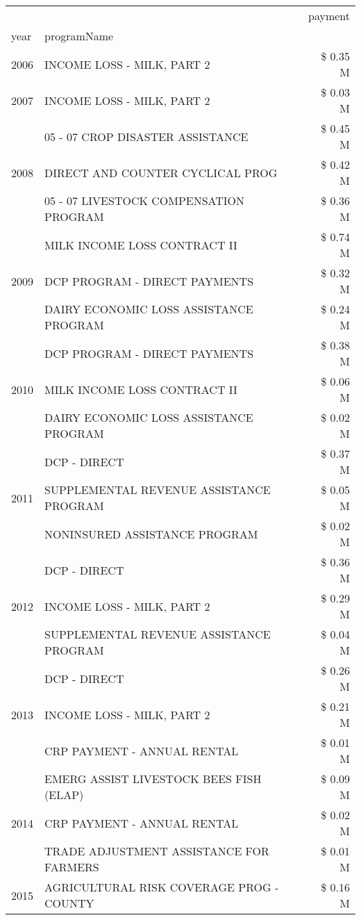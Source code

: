 \begin{tabular}{llr}
\toprule
 &  & payment \\
year & programName &  \\
\midrule
2006 & INCOME LOSS - MILK, PART 2 & \$ 0.35 M \\
\cline{1-3}
2007 & INCOME LOSS - MILK, PART 2 & \$ 0.03 M \\
\cline{1-3}
\multirow[t]{3}{*}{2008} & 05 - 07 CROP DISASTER ASSISTANCE & \$ 0.45 M \\
 & DIRECT AND COUNTER CYCLICAL PROG & \$ 0.42 M \\
 & 05 - 07 LIVESTOCK COMPENSATION PROGRAM & \$ 0.36 M \\
\cline{1-3}
\multirow[t]{3}{*}{2009} & MILK INCOME LOSS CONTRACT II & \$ 0.74 M \\
 & DCP PROGRAM - DIRECT PAYMENTS & \$ 0.32 M \\
 & DAIRY ECONOMIC LOSS ASSISTANCE PROGRAM & \$ 0.24 M \\
\cline{1-3}
\multirow[t]{3}{*}{2010} & DCP PROGRAM - DIRECT PAYMENTS & \$ 0.38 M \\
 & MILK INCOME LOSS CONTRACT II & \$ 0.06 M \\
 & DAIRY ECONOMIC LOSS ASSISTANCE PROGRAM & \$ 0.02 M \\
\cline{1-3}
\multirow[t]{3}{*}{2011} & DCP - DIRECT & \$ 0.37 M \\
 & SUPPLEMENTAL REVENUE ASSISTANCE PROGRAM & \$ 0.05 M \\
 & NONINSURED ASSISTANCE PROGRAM & \$ 0.02 M \\
\cline{1-3}
\multirow[t]{3}{*}{2012} & DCP - DIRECT & \$ 0.36 M \\
 & INCOME LOSS - MILK, PART 2 & \$ 0.29 M \\
 & SUPPLEMENTAL REVENUE ASSISTANCE PROGRAM & \$ 0.04 M \\
\cline{1-3}
\multirow[t]{3}{*}{2013} & DCP - DIRECT & \$ 0.26 M \\
 & INCOME LOSS - MILK, PART 2 & \$ 0.21 M \\
 & CRP PAYMENT - ANNUAL RENTAL & \$ 0.01 M \\
\cline{1-3}
\multirow[t]{3}{*}{2014} & EMERG ASSIST LIVESTOCK BEES FISH (ELAP) & \$ 0.09 M \\
 & CRP PAYMENT - ANNUAL RENTAL & \$ 0.02 M \\
 & TRADE ADJUSTMENT ASSISTANCE FOR FARMERS & \$ 0.01 M \\
\cline{1-3}
\multirow[t]{3}{*}{2015} & AGRICULTURAL RISK COVERAGE PROG - COUNTY & \$ 0.16 M \\

\end{tabular}
